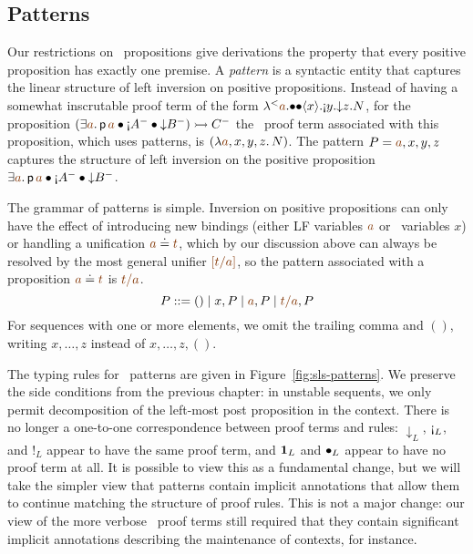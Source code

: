 \subsection{Patterns}
\label{sec:framework-patterns}

Our restrictions on \sls~propositions give derivations the property
that every positive proposition has exactly one premise. A {\it
  pattern} is a syntactic entity that captures the linear structure of
left inversion on positive propositions. Instead of having a somewhat
inscrutable proof term of the form
${\tlaml{\texistsl{\lf{a}}
   {\tfusel{\tfusel{\tetap{x}{\tgnabl{y}{\tdownl{z}{N}}}}}}}}$,
for the proposition 
%
$(\exists \lf{a}.\,{\sf p}\,\lf{a} 
             \fuse {\gnab}A^-
             \fuse {\downarrow}B^-) \lefti C^-$
%
the \sls~proof term associated with this proposition, which uses patterns, is
$(\lambda \lf{a},x,y,z.\, N)$. The pattern $P = \lf{a}, x,y,z$ captures
the structure of left inversion on the positive proposition 
$\exists \lf{a}.\,{\sf p}\,\lf{a} 
             \fuse {\gnab}A^-
             \fuse {\downarrow}B^-$.

The grammar of patterns is simple.
% 
Inversion on positive propositions
can only have the effect of introducing new bindings (either LF
variables $\lf{a}$ or \sls~variables $x$) or handling a unification
$\lf{a} \doteq \lf{t}$, which by our discussion above can always be
resolved by the most general unifier $\lf{[t/a]}$, so the pattern associated
with a proposition $\lf{a} \doteq \lf{t}$ is $\lf{t/a}$. 
\[
P ::= () \mid x, P \mid \lf{a}, P \mid \lf{t/a}, P
\] 
For sequences with one or more elements, we omit the trailing
comma and $()$, writing $x, \ldots, z$ 
instead of $x, \ldots, z, ()$. 

The typing rules for \sls~patterns are given in
Figure~\ref{fig:sls-patterns}. We preserve the side conditions from
the previous chapter: in unstable sequents, we only permit
decomposition of the left-most post proposition in the context. There
is no longer a one-to-one correspondence between proof terms and
rules: ${\downarrow}_L$, ${\gnab}_L$, and ${!}_L$ appear to have the
same proof term, and ${\mathbf{1}}_L$ and ${\mathbin{\bullet}}_L$ appear to have no
proof term at all. It is possible to view this as a fundamental
change, but we will take the simpler view that patterns contain
implicit annotations that allow them to continue matching the
structure of proof rules. This is not a major change: our view of the
more verbose \ollll~proof terms still required that they contain
significant implicit annotations describing the maintenance of
contexts, for instance.


